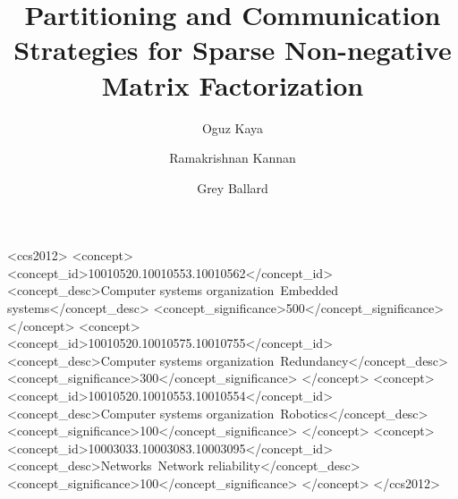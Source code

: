 \documentclass[sigconf, review=true]{acmart}
\begin{document}
\title{Partitioning and Communication Strategies for Sparse Non-negative Matrix Factorization}

\author{Oguz Kaya}

\author{Ramakrishnan Kannan}

\author{Grey Ballard}


%
%
\begin{CCSXML}
<ccs2012>
 <concept>
  <concept_id>10010520.10010553.10010562</concept_id>
  <concept_desc>Computer systems organization~Embedded systems</concept_desc>
  <concept_significance>500</concept_significance>
 </concept>
 <concept>
  <concept_id>10010520.10010575.10010755</concept_id>
  <concept_desc>Computer systems organization~Redundancy</concept_desc>
  <concept_significance>300</concept_significance>
 </concept>
 <concept>
  <concept_id>10010520.10010553.10010554</concept_id>
  <concept_desc>Computer systems organization~Robotics</concept_desc>
  <concept_significance>100</concept_significance>
 </concept>
 <concept>
  <concept_id>10003033.10003083.10003095</concept_id>
  <concept_desc>Networks~Network reliability</concept_desc>
  <concept_significance>100</concept_significance>
 </concept>
</ccs2012>  
\end{CCSXML}
\end{document}
